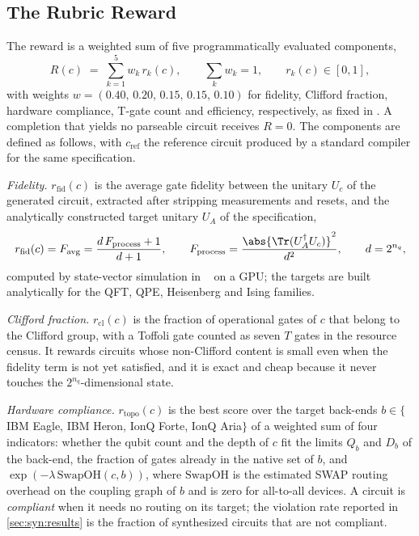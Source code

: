 \subsection{The Rubric Reward}\label{sec:syn:rubric}

The reward is a weighted sum of five programmatically evaluated components,
\begin{equation}\label{eq:syn:rubric}
  R(c) \;=\; \sum_{k=1}^{5} w_k\, r_k(c),\qquad \sum_k w_k = 1,\qquad r_k(c)\in[0,1],
\end{equation}
with weights $w=(0.40,\,0.20,\,0.15,\,0.15,\,0.10)$ for fidelity, Clifford fraction, hardware compliance, T-gate count and efficiency, respectively, as fixed in \cite{guo2026rubriq}. A completion that yields no parseable circuit receives $R=0$. The components are defined as follows, with $c_{\mathrm{ref}}$ the reference circuit produced by a standard compiler for the same specification.

\emph{Fidelity.} $r_{\mathrm{fid}}(c)$ is the average gate fidelity between the unitary $U_c$ of the generated circuit, extracted after stripping measurements and resets, and the analytically constructed target unitary $U_A$ of the specification,
\begin{equation}\label{eq:syn:fid}
  r_{\mathrm{fid}}(c) = F_{\mathrm{avg}} = \frac{d\,F_{\mathrm{process}}+1}{d+1},\qquad F_{\mathrm{process}} = \frac{\abs{\Tr(U_A^{\dagger}U_c)}^{2}}{d^{2}},\qquad d=2^{n_q},
\end{equation}
computed by state-vector simulation in \cudaq{}~\cite{kim2023cudaquantum} on a GPU; the targets are built analytically for the QFT, QPE, Heisenberg and Ising families.

\emph{Clifford fraction.} $r_{\mathrm{cl}}(c)$ is the fraction of operational gates of $c$ that belong to the Clifford group, with a Toffoli gate counted as seven $T$ gates in the resource census. It rewards circuits whose non-Clifford content is small even when the fidelity term is not yet satisfied, and it is exact and cheap because it never touches the $2^{n_q}$-dimensional state.

\emph{Hardware compliance.} $r_{\mathrm{topo}}(c)$ is the best score over the target back-ends $b\in\{$IBM Eagle, IBM Heron, IonQ Forte, IonQ Aria$\}$ of a weighted sum of four indicators: whether the qubit count and the depth of $c$ fit the limits $Q_b$ and $D_b$ of the back-end, the fraction of gates already in the native set of $b$, and $\exp(-\lambda\,\mathrm{SwapOH}(c,b))$, where $\mathrm{SwapOH}$ is the estimated SWAP routing overhead on the coupling graph of $b$ and is zero for all-to-all devices. A circuit is \emph{compliant} when it needs no routing on its target; the violation rate reported in \cref{sec:syn:results} is the fraction of synthesized circuits that are not compliant.

